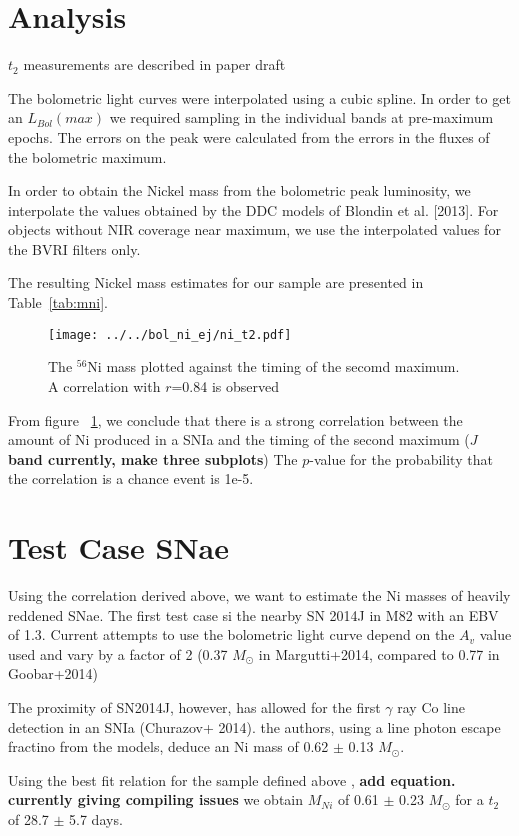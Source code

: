 \documentclass{article}
\begin{document}
\section{Analysis}
$t_2$ measurements are described in paper draft

The bolometric light curves were interpolated using a cubic spline. In order to get an $L_{Bol}(max)$ we required sampling in the individual bands at pre-maximum epochs. The errors on the peak were calculated from the errors in the fluxes of the bolometric maximum.  

In order to obtain the Nickel mass from the bolometric peak luminosity, we interpolate the values obtained by the DDC models of Blondin et al. [2013]. For objects without NIR coverage near maximum, we use the interpolated values for the BVRI filters only.  

The resulting Nickel mass estimates for our sample are presented in Table~\ref{tab:mni}.

\begin{figure}
\texttt{[image: ../../bol\_ni\_ej/ni\_t2.pdf]}
\caption{The $^{56}$Ni mass plotted against the timing of the secomd maximum. A correlation with $r$=0.84 is observed}
\label{fig:t2_mni}
\end{figure}

From figure ~\ref{fig:t2_mni}, we conclude that there is a strong correlation between the amount of Ni produced in a SNIa and the timing of the second maximum ({\bf $J$ band currently, make three subplots}) The $p$-value for the probability that the correlation is a chance event is 1e-5. 



\section{Test Case SNae}
Using the correlation derived above, we want to estimate the Ni masses of heavily reddened SNae. The first test case si the nearby SN 2014J in M82 with an EBV of 1.3. Current attempts to use the bolometric light curve depend on the $A_v$ value used and vary by a factor of 2 (0.37 $M_{\odot}$ in Margutti+2014, compared to 0.77 in Goobar+2014)

The proximity of SN2014J, however, has allowed for the first $\gamma$ ray Co line detection in an SNIa (Churazov+ 2014). the authors, using a line photon escape fractino from the models, deduce an Ni mass of 0.62  $\pm$ 0.13 $M_{\odot}$.

Using the best fit relation for the sample defined above , {\bf add equation. currently giving compiling issues} we obtain $M_{Ni}$ of 0.61 $\pm$ 0.23 $M_{\odot}$  for a $t_2$ of 28.7 $\pm$ 5.7 days. 
\end{document}
